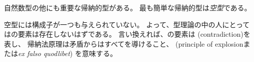\documentclass[index]{subfiles}
\begin{document}

自然数型の他にも重要な帰納的型がある。
最も簡単な帰納的型は\emph{空型}である。



空型には構成子が一つも与えられていない。
よって、型理論の中の人にとっては\myInlineMath{\myEmptyType}の要素は存在しないはずである。
言い換えれば、\myInlineMath{\myEmptyType}の要素は
(contradiction)を表し、
帰納法原理は矛盾からはすべてを導けること、
(principle of explosionまたは\textit{ex falso quodlibet})
を意味する。


\end{document}
